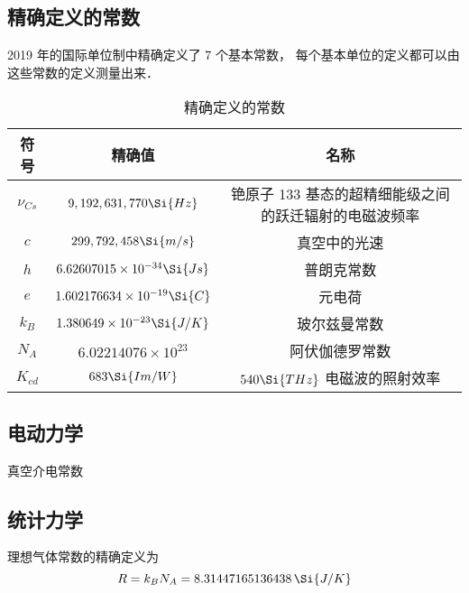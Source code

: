 

\subsection{精确定义的常数}
2019 年的国际单位制中精确定义了 7 个基本常数， 每个基本单位的定义都可以由这些常数的定义测量出来．
\begin{table}[ht]
\centering
\caption{精确定义的常数}\label{Consts_tab1}
\begin{tabular}{|c|c|c|}
\hline
符号 & 精确值 & 名称 \\
\hline
$\nu_{Cs}$ & $9,192,631,770\Si{Hz}$ & 铯原子 133 基态的超精细能级之间的跃迁辐射的电磁波频率 \\
\hline
$c$ & $299,792,458\Si{m/s}$ & 真空中的光速 \\
\hline
$h$ & $6.62607015\times 10^{-34}\Si{Js}$ & 普朗克常数 \\
\hline
$e$ & $1.602176634\times 10^{-19}\Si{C} $ & 元电荷 \\
\hline
$k_B$ & $1.380649\times 10^{-23} \Si{J/K}$ & 玻尔兹曼常数 \\
\hline
$N_A$ & $6.02214076\times 10^{23} $ & 阿伏伽德罗常数 \\
\hline
$K_{cd}$ & $683\Si{Im/W}$ & $540\Si{THz}$ 电磁波的照射效率 \\
\hline
\end{tabular}
\end{table}

\subsection{电动力学}
真空介电常数

\subsection{统计力学}
理想气体常数的精确定义为
\begin{equation}
R = k_B N_A = 8.31447165136438 \,\Si{J/K}
\end{equation}
